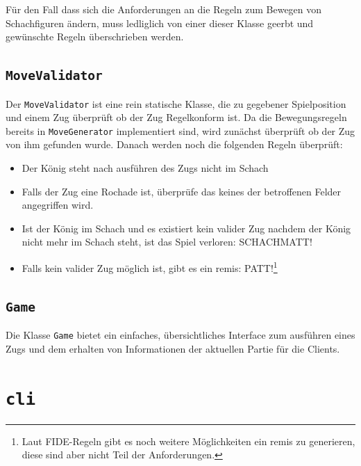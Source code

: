 \documentclass{scrreprt}
\newcommand{\lstinlinejava}[1]{\lstinline[language=java]{#1}}
\newcommand{\lstj}[1]{\lstinlinejava{#1}}
\begin{document}
Für den Fall dass sich die Anforderungen an die Regeln zum Bewegen von Schachfiguren ändern, muss ledliglich von einer dieser Klasse geerbt und gewünschte Regeln überschrieben werden.


\section{\lstj{MoveValidator}}
Der \lstj{MoveValidator} ist eine rein statische Klasse, die zu gegebener Spielposition und einem Zug überprüft ob der Zug Regelkonform ist. Da die Bewegungsregeln bereits in \lstj{MoveGenerator} implementiert sind, wird zunächst überprüft ob der Zug von ihm gefunden wurde. Danach werden noch die folgenden Regeln überprüft:

\begin{itemize}
\item
  Der König steht nach ausführen des Zugs nicht im Schach
  
\item
  Falls der Zug eine Rochade ist, überprüfe das keines der betroffenen Felder angegriffen wird.
  
\item
  Ist der König im Schach und es existiert kein valider Zug nachdem der König nicht mehr im Schach steht, ist das Spiel verloren: SCHACHMATT!
  
\item
  Falls kein valider Zug möglich ist, gibt es ein remis: PATT!\footnote{Laut FIDE-Regeln gibt es noch weitere Möglichkeiten ein remis zu generieren, diese sind aber nicht Teil der Anforderungen.}
\end{itemize}



\section{\lstj{Game}}

Die Klasse \lstj{Game} bietet ein einfaches, übersichtliches Interface zum ausführen eines Zugs und dem erhalten von Informationen der aktuellen Partie für die Clients.




\chapter{\lstj{cli}}
\end{document}

